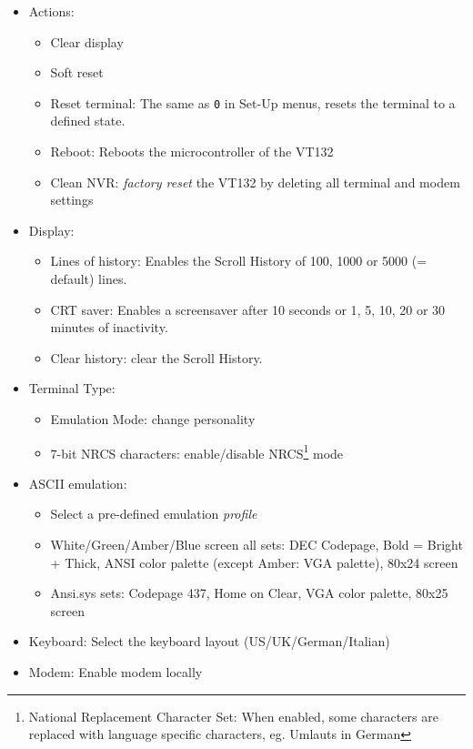\begin{itemize}[leftmargin=1em]
 \item Actions:
 \begin{itemize}[noitemsep]
  \item Clear display
  \item Soft reset
  \item Reset terminal: The same as \texttt{0} in Set-Up menus, resets the terminal to a defined state.
  \item Reboot: Reboots the microcontroller of the VT132
  \item Clean NVR: \textit{factory reset} the VT132 by deleting all terminal and modem settings
 \end{itemize}
 \item Display:
 \begin{itemize}[noitemsep]
  \item Lines of history: Enables the Scroll History of 100, 1000 or 5000 (= default) lines.
  \item CRT saver: Enables a screensaver after 10 seconds or 1, 5, 10, 20 or 30 minutes of inactivity.
  \item Clear history: clear the Scroll History.
 \end{itemize}
\newpage
 \item Terminal Type:
 \begin{itemize}[noitemsep]
  \item Emulation Mode: change personality
  \item 7-bit NRCS characters: enable/disable NRCS\footnote{National Replacement Character Set: When enabled, some characters are replaced with language specific 
	characters, eg. Umlauts in German} mode
 \end{itemize}
 \item ASCII emulation:
 \begin{itemize}[noitemsep]
  \item Select a pre-defined emulation \textit{profile}
  \item White/Green/Amber/Blue screen all sets: DEC Codepage, Bold = Bright + Thick, ANSI color palette (except Amber: VGA palette), 80x24 screen
  \item Ansi.sys sets: Codepage 437, Home on Clear, VGA color palette, 80x25 screen
 \end{itemize}
 \item Keyboard: Select the keyboard layout (US/UK/German/Italian)
 \item Modem: Enable modem locally
 \begin{itemize}[noitemsep]

\end{itemize}
\end{itemize}
